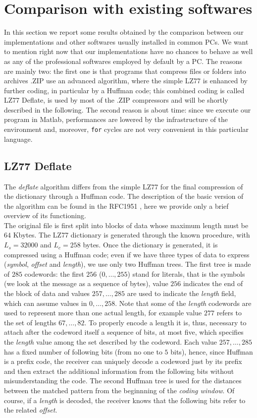 \section{Comparison with existing softwares}
In this section we report some results obtained by the comparison between our implementations and other softwares usually installed in common PCs. We want to mention right now that our implementations have no chances to behave as well as any of the professional softwares employed by default by a PC. The reasons are mainly two: the first one is that programs that compress files or folders into archives .ZIP use an advanced algorithm, where the simple LZ77 is enhanced by further coding, in particular by a Huffman code; this combined coding is called LZ77 Deflate, is used by most of the .ZIP compressors and will be shortly described in the following. The second reason is about time: since we execute our program in Matlab, performances are lowered by the infrastructure of the environment and, moreover, \texttt{for} cycles are not very convenient in this particular language. 

\subsection{LZ77 Deflate}
The \textit{deflate} algorithm differs from the simple LZ77 for the final compression of the dictionary through a Huffman code. The description of the basic version of the algorithm can be found in the RFC1951 \cite{deut1}, here we provide only a brief overview of its functioning.
\\

The original file is first split into blocks of data whose maximum length must be $64$ Kbytes. The LZ77 dictionary is generated through the known procedure, with $L_s = 32000$ and $L_c = 258$ bytes. Once the dictionary is generated, it is compressed using a Huffman code; even if we have three types of data to express (\textit{symbol}, \textit{offset} and \textit{length}), we use only two Huffman trees. The first tree is made of $285$ codewords: the first $256$ ($0, \ldots, 255$) stand for literals, that is the symbols (we look at the message as a sequence of bytes), value $256$ indicates the end of the block of data and values $257, \ldots, 285$ are used to indicate the \textit{length} field, which can assume values in $0, \ldots, 258$. Note that some of the \textit{length} codewords are used to represent more than one actual length, for example value $277$ refers to the set of lengths $67, \ldots, 82$. To properly encode a length it is, thus, necessary to attach after the codeword itself a sequence of bits, at most five, which specifies the \textit{length} value among the set described by the codeword. Each value $257, \ldots, 285$ has a fixed number of following bits (from no one to $5$ bits), hence, since Huffman is a prefix code, the receiver can uniquely decode a codeword just by its prefix and then extract the additional information from the following bits without misunderstanding the code. The second Huffman tree is used for the distances between the matched pattern from the beginnning of the \textit{coding window}. Of course, if a \textit{length} is decoded, the receiver knows that the following bits refer to the related \textit{offset}.

